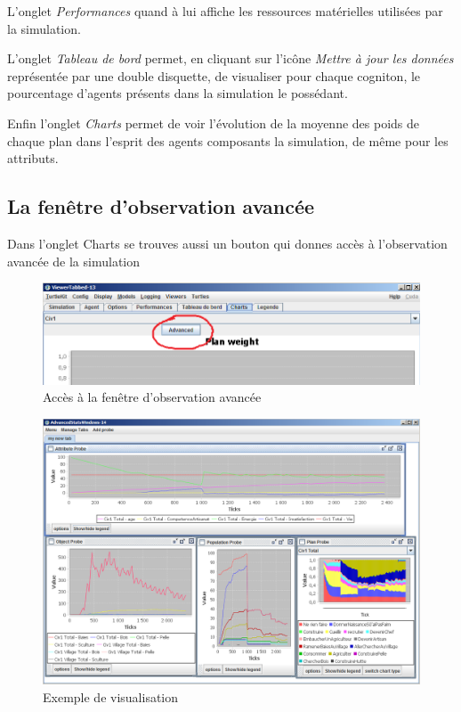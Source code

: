 L'onglet \textit{Performances} quand à lui affiche les ressources matérielles utilisées par la simulation.

L'onglet \textit{Tableau de bord} permet, en cliquant sur l'icône \textit{Mettre à jour les données} représentée par une double disquette, de visualiser pour chaque cogniton, le pourcentage d'agents présents dans la simulation le possédant. 

Enfin l'onglet \textit{Charts} permet de voir l'évolution de la moyenne des poids de chaque plan dans l'esprit des agents composants la simulation, de même pour les attributs.

\subsection{La fenêtre d'observation avancée}

Dans l'onglet Charts se trouves aussi un bouton qui donnes accès à l'observation avancée de la simulation


\begin{figure}[!ht]
\begin{center}
\includegraphics[scale=0.5]{DocumentationSimulation/images/accesAdvStats.png}
\caption[observe]{Accès à la fenêtre d'observation avancée\\}
\label{observe5}
\end{center}
\end{figure} 



\begin{figure}[!ht]
\begin{center}
\includegraphics[scale=0.5]{DocumentationSimulation/images/ADVS_Exemple.png}
\caption[observe]{Exemple de visualisation\\}
\label{observe6}
\end{center}
\end{figure} 
\newpage

